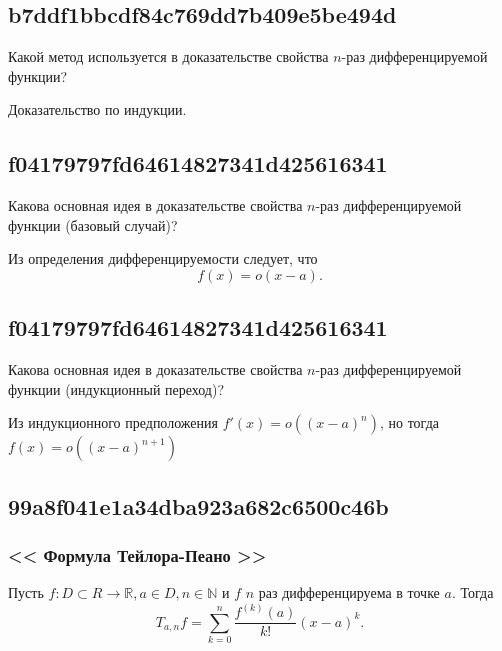 \documentclass[11pt, a5paper]{article}
\newenvironment{note}[1]{\goodbreak\par\subsection{\hfill \color{lightgray}\tiny #1}}{}
\newenvironment{cloze}[2][\ldots]{\begin{leftbar}}{\end{leftbar}}
\newenvironment{icloze}[2][\ldots]{%
  \ignorespaces\text{\tiny \color{lightgray} \{\{c#2:: }%
}{%
  \text{\tiny \color{lightgray}\}\}}\unskip%
}
\begin{document}
\begin{note}{b7ddf1bbcdf84c769dd7b409e5be494d}
    Какой метод используется в доказательстве свойства \( n \)-раз дифференцируемой функции?

    \begin{cloze}{1}
        Доказательство по индукции.
    \end{cloze}
\end{note}

\begin{note}{f04179797fd64614827341d425616341}
    Какова основная идея в доказательстве свойства \( n \)-раз дифференцируемой функции (базовый случай)?

    \begin{cloze}{1}
        Из определения дифференцируемости следует, что \[ f(x) = o(x - a). \]
    \end{cloze}
\end{note}

\begin{note}{f04179797fd64614827341d425616341}
    Какова основная идея в доказательстве свойства \( n \)-раз дифференцируемой функции (индукционный переход)?

    \begin{cloze}{1}
        Из индукционного предположения \( f'(x) = o((x - a)^{n} ) \), но тогда \( f(x) = o((x - a)^{n + 1} ) \)
    \end{cloze}
\end{note}

\begin{note}{99a8f041e1a34dba923a682c6500c46b}
    \subsubsection{<<\begin{icloze}{3}Формула Тейлора-Пеано\end{icloze}>>}

    Пусть \begin{icloze}{2}\( f : D \subset R \to \mathbb R, a \in D, n \in \mathbb N \) и \( f \) \( n \) раз дифференцируема в точке \( a. \)  \end{icloze}
    Тогда \begin{icloze}{1}\[
        T_{a, n} f = \sum_{k=0}^{n} \frac{f^{(k)} (a)}{k!} (x - a)^{k}.
    \]\end{icloze}
\end{note}
\end{document}
